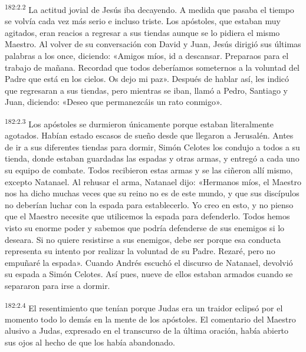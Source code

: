 \par 
\textsuperscript{182:2.2} La actitud jovial de Jesús iba decayendo. A medida que pasaba el tiempo se volvía cada vez más serio e incluso triste. Los apóstoles, que estaban muy agitados, eran reacios a regresar a sus tiendas aunque se lo pidiera el mismo Maestro. Al volver de su conversación con David y Juan, Jesús dirigió sus últimas palabras a los once, diciendo: «Amigos míos, id a descansar. Preparaos para el trabajo de mañana. Recordad que todos deberíamos someternos a la voluntad del Padre que está en los cielos. Os dejo mi paz». Después de hablar así, les indicó que regresaran a sus tiendas, pero mientras se iban, llamó a Pedro, Santiago y Juan, diciendo: «Deseo que permanezcáis un rato conmigo».

\par 
\textsuperscript{182:2.3} Los apóstoles se durmieron únicamente porque estaban literalmente agotados. Habían estado escasos de sueño desde que llegaron a Jerusalén. Antes de ir a sus diferentes tiendas para dormir, Simón Celotes los condujo a todos a su tienda, donde estaban guardadas las espadas y otras armas, y entregó a cada uno su equipo de combate. Todos recibieron estas armas y se las ciñeron allí mismo, excepto Natanael. Al rehusar el arma, Natanael dijo: «Hermanos míos, el Maestro nos ha dicho muchas veces que su reino no es de este mundo, y que sus discípulos no deberían luchar con la espada para establecerlo. Yo creo en esto, y no pienso que el Maestro necesite que utilicemos la espada para defenderlo. Todos hemos visto su enorme poder y sabemos que podría defenderse de sus enemigos si lo deseara. Si no quiere resistirse a sus enemigos, debe ser porque esa conducta representa su intento por realizar la voluntad de su Padre. Rezaré, pero no empuñaré la espada». Cuando Andrés escuchó el discurso de Natanael, devolvió su espada a Simón Celotes. Así pues, nueve de ellos estaban armados cuando se separaron para irse a dormir.

\par 
\textsuperscript{182:2.4} El resentimiento que tenían porque Judas era un traidor eclipsó por el momento todo lo demás en la mente de los apóstoles. El comentario del Maestro alusivo a Judas, expresado en el transcurso de la última oración, había abierto sus ojos al hecho de que los había abandonado.

